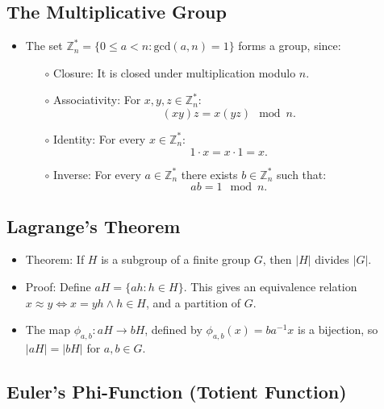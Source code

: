 \documentclass[a4paper]{scrartcl}
\begin{document}
\subsection*{The Multiplicative Group}

\begin{itemize}
\item The set $\mathbb{Z}_n^* = \{0 \leq a < n : \text{gcd}(a,n) =1 \}$ forms a group, since:
\begin{itemize}
\item [$\circ$] Closure: It is closed under multiplication modulo $n$.
\item [$\circ$] Associativity: For $x,y,z \in \mathbb{Z}_n^*:$ $$(xy)z = x(yz) \mod n.$$
\item [$\circ$] Identity: For every $x \in \mathbb{Z}_n^*:$ $$1 \cdot x = x \cdot 1 = x.$$
\item [$\circ$] Inverse: For every $a \in \mathbb{Z}_n^*$ there exists $b \in \mathbb{Z}_n^*$ such that: $$ab = 1 \mod n.$$
\end{itemize}
\end{itemize}

\subsection*{Lagrange's Theorem}

\begin{itemize}
\item Theorem: If $H$ is a subgroup of a finite group $G$, then $|H|$ divides $|G|$.
\item Proof: Define $aH = \{ah : h \in H\}$. This gives an equivalence relation $x \approx y \iff x = yh \land h \in H$, and a partition of $G$.
\item The map $\phi_{a,b}: aH \rightarrow bH$, defined by $\phi_{a,b}(x) = ba^{-1}x$ is a bijection, so $|aH| = |bH|$ for $a,b \in G$.
\end{itemize}

\subsection*{Euler's Phi-Function (Totient Function)}
\end{document}
